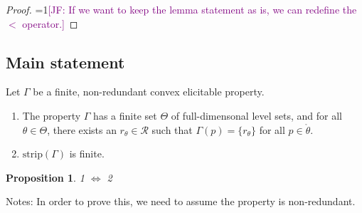 \documentclass[12pt]{article}
\newcommand{\Comments}{1}
\newcommand{\mynote}[2]{\ifnum\Comments=1\textcolor{#1}{#2}\fi}
\newcommand{\jessie}[1]{\mynote{purple}{[JF: #1]}}
\newcommand{\R}{\mathcal{R}}
\newcommand{\inter}[1]{\mathring{#1}}%
\newcommand{\strip}{\text{strip}}
\newtheorem{proposition}{Proposition}
\begin{document}
\begin{proof}
\jessie{If we want to keep the lemma statement as is, we can redefine the $<$ operator.} 
 
\end{proof}

\subsection{Main statement}

Let $\Gamma$ be a finite, non-redundant convex elicitable property.

\begin{enumerate}
\item The property $\Gamma$ has a finite set $\Theta$ of full-dimensonal level sets, and for all $\theta \in \Theta$, there exists an $r_\theta \in \R$ such that $\Gamma(p) = \{r_\theta\}$ for all $p \in \inter{\theta}$.
\item $\text{strip}(\Gamma)$ is finite.
\end{enumerate}

\begin{proposition}\label{prop:optimal-reports-per-level-set}
1 $\iff$ 2
\end{proposition}



Notes:
In order to prove this, we need to assume the property is non-redundant.
\end{document}
